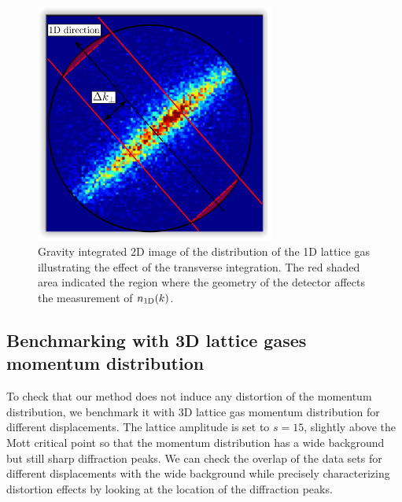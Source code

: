 \begin{figure}
    \centering
    \includegraphics[width=0.7\textwidth]{Fig/Chapter5/1D_transverse_integration.png}
    \caption{Gravity integrated 2D image of the distribution of the 1D lattice gas illustrating the effect of the transverse integration. The red shaded area indicated the region where the geometry of the detector affects the measurement of $n_{\rm{1D}} (k)$.}
    \label{fig:1D_integration}
\end{figure}

\subsection{Benchmarking with 3D lattice gases momentum distribution}

To check that our method does not induce any distortion of the momentum distribution, we benchmark it with 3D lattice gas momentum distribution for different displacements. The lattice amplitude is set to $s=15$, \ie slightly above the Mott critical point so that the momentum distribution has a wide background but still sharp diffraction peaks. We can check the overlap of the data sets for different displacements with the wide background while precisely characterizing distortion effects by looking at the location of the diffraction peaks.

